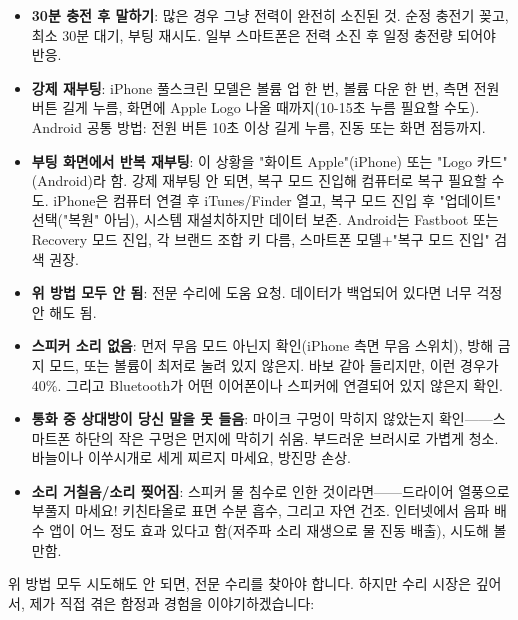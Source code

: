 \begin{itemize}
  \item \textbf{30분 충전 후 말하기}: 많은 경우 그냥 전력이 완전히 소진된 것. 순정 충전기 꽂고, 최소 30분 대기, 부팅 재시도. 일부 스마트폰은 전력 소진 후 일정 충전량 되어야 반응.
  \item \textbf{강제 재부팅}: iPhone 풀스크린 모델은 볼륨 업 한 번, 볼륨 다운 한 번, 측면 전원 버튼 길게 누름, 화면에 Apple Logo 나올 때까지(10-15초 누름 필요할 수도). Android 공통 방법: 전원 버튼 10초 이상 길게 누름, 진동 또는 화면 점등까지.
  \item \textbf{부팅 화면에서 반복 재부팅}: 이 상황을 "화이트 Apple"(iPhone) 또는 "Logo 카드"(Android)라 함. 강제 재부팅 안 되면, 복구 모드 진입해 컴퓨터로 복구 필요할 수도. iPhone은 컴퓨터 연결 후 iTunes/Finder 열고, 복구 모드 진입 후 "업데이트" 선택("복원" 아님), 시스템 재설치하지만 데이터 보존. Android는 Fastboot 또는 Recovery 모드 진입, 각 브랜드 조합 키 다름, 스마트폰 모델+"복구 모드 진입" 검색 권장.
  \item \textbf{위 방법 모두 안 됨}: 전문 수리에 도움 요청. 데이터가 백업되어 있다면 너무 걱정 안 해도 됨.
\end{itemize}


\begin{itemize}
  \item \textbf{스피커 소리 없음}: 먼저 무음 모드 아닌지 확인(iPhone 측면 무음 스위치), 방해 금지 모드, 또는 볼륨이 최저로 눌려 있지 않은지. 바보 같아 들리지만, 이런 경우가 40\%. 그리고 Bluetooth가 어떤 이어폰이나 스피커에 연결되어 있지 않은지 확인.
  \item \textbf{통화 중 상대방이 당신 말을 못 들음}: 마이크 구멍이 막히지 않았는지 확인——스마트폰 하단의 작은 구멍은 먼지에 막히기 쉬움. 부드러운 브러시로 가볍게 청소. 바늘이나 이쑤시개로 세게 찌르지 마세요, 방진망 손상.
  \item \textbf{소리 거칠음/소리 찢어짐}: 스피커 물 침수로 인한 것이라면——드라이어 열풍으로 부풀지 마세요! 키친타올로 표면 수분 흡수, 그리고 자연 건조. 인터넷에서 음파 배수 앱이 어느 정도 효과 있다고 함(저주파 소리 재생으로 물 진동 배출), 시도해 볼 만함.
\end{itemize}


위 방법 모두 시도해도 안 되면, 전문 수리를 찾아야 합니다. 하지만 수리 시장은 깊어서, 제가 직접 겪은 함정과 경험을 이야기하겠습니다:


